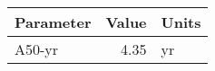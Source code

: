 \begin{table}[htb]
\centering
\begin{tabular}{lrl}
\toprule
\multicolumn{1}{c}{\textbf{Parameter}} & \multicolumn{1}{c}{\textbf{Value}} & \multicolumn{1}{c}{\textbf{Units}} \\
\midrule
A50-yr & 4.35 & yr \\
\bottomrule
\end{tabular}
\label{tab:lhdet}
\end{table}

